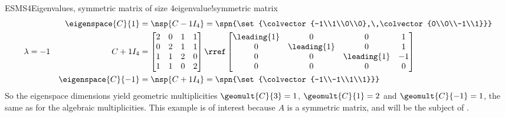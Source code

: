 \begin{example}{ESMS4}{Eigenvalues, symmetric matrix of size 4}{eigenvalue!symmetric matrix}
\begin{align*}
&&\eigenspace{C}{1}&=\nsp{C-1I_4}
=\spn{\set{\colvector{-1\\1\\0\\0},\,\colvector{0\\0\\-1\\1}}}\\
%
\lambda&=-1&C+1I_4&=
\begin{bmatrix}
2 & 0 & 1 & 1\\
0 & 2 & 1 & 1\\
1 & 1 & 2 & 0\\
1 & 1 & 0 & 2
\end{bmatrix}
\rref
\begin{bmatrix}
\leading{1} & 0 & 0 & 1\\
0 & \leading{1} & 0 & 1\\
0 & 0 & \leading{1} & -1\\
0 & 0 & 0 & 0
\end{bmatrix}\\
&&\eigenspace{C}{-1}&=\nsp{C+1I_4}
=\spn{\set{\colvector{-1\\-1\\1\\1}}}\\
%
\end{align*}
%
So the eigenspace dimensions yield geometric multiplicities $\geomult{C}{3}=1$, $\geomult{C}{1}=2$ and $\geomult{C}{-1}=1$, the same as for the algebraic multiplicities.  This example is of interest because $A$ is a symmetric matrix, and will be the subject of .
%
\end{example}
%  
